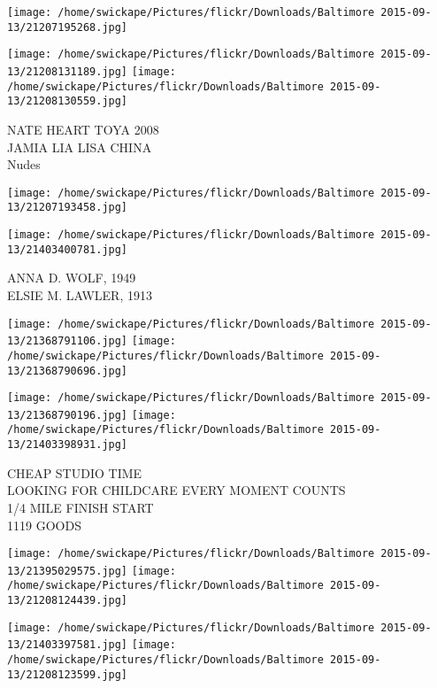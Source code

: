 \documentclass[10pt,letterpaper]{article}
\begin{document}
\texttt{[image: /home/swickape/Pictures/flickr/Downloads/Baltimore 2015-09-13/21207195268.jpg]}

\vspace{0.25in}
\texttt{[image: /home/swickape/Pictures/flickr/Downloads/Baltimore 2015-09-13/21208131189.jpg]}
\texttt{[image: /home/swickape/Pictures/flickr/Downloads/Baltimore 2015-09-13/21208130559.jpg]}

NATE HEART TOYA 2008\\
JAMIA LIA LISA CHINA\\
Nudes\\
\pagebreak

\texttt{[image: /home/swickape/Pictures/flickr/Downloads/Baltimore 2015-09-13/21207193458.jpg]}

\vspace{0.25in}
\texttt{[image: /home/swickape/Pictures/flickr/Downloads/Baltimore 2015-09-13/21403400781.jpg]}

ANNA D. WOLF, 1949\\
ELSIE M. LAWLER, 1913\\
\pagebreak

\texttt{[image: /home/swickape/Pictures/flickr/Downloads/Baltimore 2015-09-13/21368791106.jpg]}
\texttt{[image: /home/swickape/Pictures/flickr/Downloads/Baltimore 2015-09-13/21368790696.jpg]}

\texttt{[image: /home/swickape/Pictures/flickr/Downloads/Baltimore 2015-09-13/21368790196.jpg]}
\texttt{[image: /home/swickape/Pictures/flickr/Downloads/Baltimore 2015-09-13/21403398931.jpg]}

CHEAP STUDIO TIME\\
LOOKING FOR CHILDCARE EVERY MOMENT COUNTS\\
1/4 MILE FINISH START\\
1119 GOODS\\
\pagebreak

\texttt{[image: /home/swickape/Pictures/flickr/Downloads/Baltimore 2015-09-13/21395029575.jpg]}
\texttt{[image: /home/swickape/Pictures/flickr/Downloads/Baltimore 2015-09-13/21208124439.jpg]}

\texttt{[image: /home/swickape/Pictures/flickr/Downloads/Baltimore 2015-09-13/21403397581.jpg]}
\texttt{[image: /home/swickape/Pictures/flickr/Downloads/Baltimore 2015-09-13/21208123599.jpg]}
\end{document}
